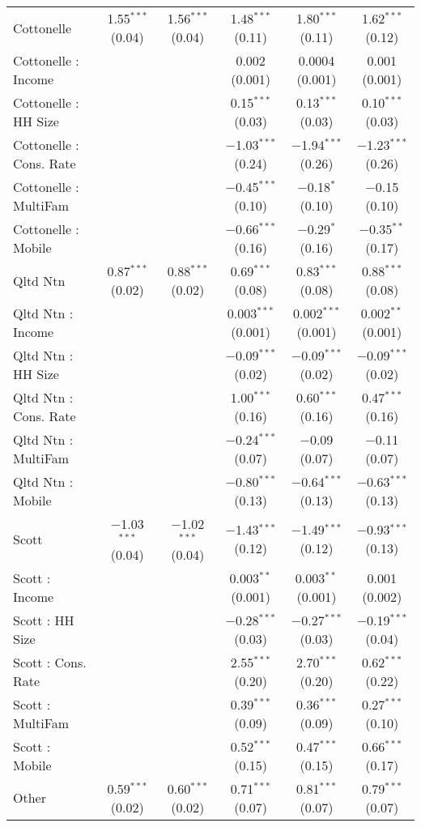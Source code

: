 \begin{table}[!htbp]
\begin{tabular}{@{\extracolsep{5pt}}lccccc}
  Cottonelle & 1.55$^{***}$ (0.04) & 1.56$^{***}$ (0.04) & 1.48$^{***}$ (0.11) & 1.80$^{***}$ (0.11) & 1.62$^{***}$ (0.12) \\ 
  Cottonelle : Income &  &  & 0.002 (0.001) & 0.0004 (0.001) & 0.001 (0.001) \\ 
  Cottonelle : HH Size &  &  & 0.15$^{***}$ (0.03) & 0.13$^{***}$ (0.03) & 0.10$^{***}$ (0.03) \\ 
  Cottonelle : Cons. Rate &  &  & $-$1.03$^{***}$ (0.24) & $-$1.94$^{***}$ (0.26) & $-$1.23$^{***}$ (0.26) \\ 
  Cottonelle : MultiFam &  &  & $-$0.45$^{***}$ (0.10) & $-$0.18$^{*}$ (0.10) & $-$0.15 (0.10) \\ 
  Cottonelle : Mobile &  &  & $-$0.66$^{***}$ (0.16) & $-$0.29$^{*}$ (0.16) & $-$0.35$^{**}$ (0.17) \\ 
  Qltd Ntn & 0.87$^{***}$ (0.02) & 0.88$^{***}$ (0.02) & 0.69$^{***}$ (0.08) & 0.83$^{***}$ (0.08) & 0.88$^{***}$ (0.08) \\ 
  Qltd Ntn : Income &  &  & 0.003$^{***}$ (0.001) & 0.002$^{***}$ (0.001) & 0.002$^{**}$ (0.001) \\ 
  Qltd Ntn : HH Size &  &  & $-$0.09$^{***}$ (0.02) & $-$0.09$^{***}$ (0.02) & $-$0.09$^{***}$ (0.02) \\ 
  Qltd Ntn : Cons. Rate &  &  & 1.00$^{***}$ (0.16) & 0.60$^{***}$ (0.16) & 0.47$^{***}$ (0.16) \\ 
  Qltd Ntn : MultiFam &  &  & $-$0.24$^{***}$ (0.07) & $-$0.09 (0.07) & $-$0.11 (0.07) \\ 
  Qltd Ntn : Mobile &  &  & $-$0.80$^{***}$ (0.13) & $-$0.64$^{***}$ (0.13) & $-$0.63$^{***}$ (0.13) \\ 
  Scott & $-$1.03$^{***}$ (0.04) & $-$1.02$^{***}$ (0.04) & $-$1.43$^{***}$ (0.12) & $-$1.49$^{***}$ (0.12) & $-$0.93$^{***}$ (0.13) \\ 
  Scott : Income &  &  & 0.003$^{**}$ (0.001) & 0.003$^{**}$ (0.001) & 0.001 (0.002) \\ 
  Scott : HH Size &  &  & $-$0.28$^{***}$ (0.03) & $-$0.27$^{***}$ (0.03) & $-$0.19$^{***}$ (0.04) \\ 
  Scott : Cons. Rate &  &  & 2.55$^{***}$ (0.20) & 2.70$^{***}$ (0.20) & 0.62$^{***}$ (0.22) \\ 
  Scott : MultiFam &  &  & 0.39$^{***}$ (0.09) & 0.36$^{***}$ (0.09) & 0.27$^{***}$ (0.10) \\ 
  Scott : Mobile &  &  & 0.52$^{***}$ (0.15) & 0.47$^{***}$ (0.15) & 0.66$^{***}$ (0.17) \\ 
  Other & 0.59$^{***}$ (0.02) & 0.60$^{***}$ (0.02) & 0.71$^{***}$ (0.07) & 0.81$^{***}$ (0.07) & 0.79$^{***}$ (0.07) \\ 

\end{tabular}
\end{table}
